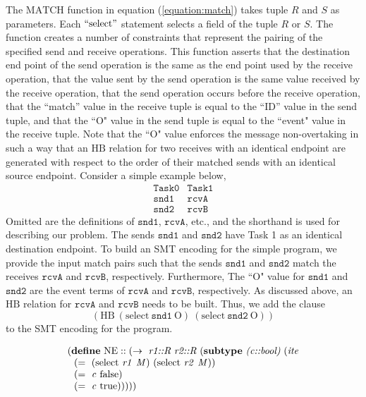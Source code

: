 The $\mathrm{MATCH}$ function in equation (\ref{equation:match}) takes tuple $R$ and $S$ as parameters. Each $``\mathrm{select}"$ statement selects a field of the tuple $R$ or $S$. The function creates a number of constraints that represent the pairing
of the specified send and receive operations. This function asserts that the
destination end point of the send operation is the same as the end point used by
the receive operation, that the value sent by the send operation is the same
value received by the receive operation, that the send operation occurs before
the receive operation, that the ``match'' value in the receive tuple is
equal to the ``ID'' value in the send tuple, and that the ``O" value in the send tuple is equal to the ``event" value in the receive tuple. Note that the ``O" value enforces the message non-overtaking in such a way that an $\mathrm{HB}$ relation for two receives with an identical endpoint are generated with respect to the order of their matched sends with an identical source endpoint. Consider a simple example below,
\[
\begin{array}{cc}
\mathtt{Task 0} & \mathtt{Task 1} \\
\mathtt{snd1} & \mathtt{rcvA} \\
\mathtt{snd2} & \mathtt{rcvB}
\end{array}
\]
Omitted are the definitions of $\mathtt{snd1}$, $\mathtt{rcvA}$, etc., and the shorthand is used for describing our problem. The sends $\mathtt{snd1}$ and $\mathtt{snd2}$ have Task 1 as an identical destination endpoint. To build an SMT encoding for the simple program, we provide the input match pairs such that the sends $\mathtt{snd1}$ and $\mathtt{snd2}$ match the receives $\mathtt{rcvA}$ and $\mathtt{rcvB}$, respectively. Furthermore, The ``O" value for $\mathtt{snd1}$ and $\mathtt{snd2}$ are the event terms of $\mathtt{rcvA}$ and $\mathtt{rcvB}$, respectively. As discussed above, an $\mathrm{HB}$ relation for $\mathtt{rcvA}$ and $\mathtt{rcvB}$ needs to be built. Thus, we add the clause
\[(\mathrm{HB}\ (\mathrm{select}\ \mathtt{snd1}\ \mathrm{O})\ (\mathrm{select}\ \mathtt{snd2}\ \mathrm{O}))\]
to the SMT encoding for the program.


\begin{equation}
\begin{array}{l}
(\cfgt{define}\ \mathrm{NE}::(\rightarrow\ \cfgnt{r1::R}\ \cfgnt{r2::R}\ (\cfgt{subtype}\ \cfgnt{(c::bool)}\ (\cfgnt{ite} \\
\ \ (=\ (\mathrm{select}\ \mathit{r1}\ \mathit{M})\ (\mathrm{select}\ \mathit{r2}\ \mathit{M})) \\
\ \ (=\ \mathit{c}\ \mathrm{false}) \\
\ \ (=\ \mathit{c}\ \mathrm{true})))))
\end{array}
\label{equation:ne}
\end{equation}

